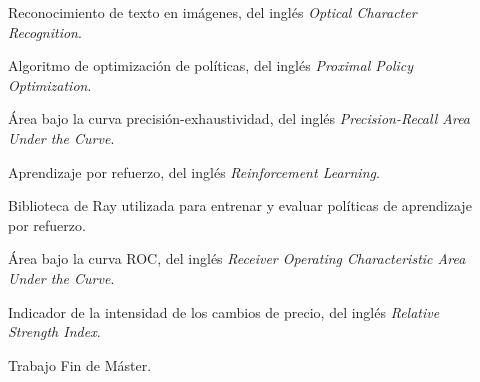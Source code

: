 \begin{description}
  \item[] Reconocimiento de texto en imágenes, del inglés \emph{Optical Character Recognition}.
  \item[] Algoritmo de optimización de políticas, del inglés \emph{Proximal Policy Optimization}.
  \item[] Área bajo la curva precisión-exhaustividad, del inglés \emph{Precision-Recall Area Under the Curve}.
  \item[] Aprendizaje por refuerzo, del inglés \emph{Reinforcement Learning}.
  \item[] Biblioteca de Ray utilizada para entrenar y evaluar políticas de aprendizaje por refuerzo.
  \item[] Área bajo la curva ROC, del inglés \emph{Receiver Operating Characteristic Area Under the Curve}.
  \item[] Indicador de la intensidad de los cambios de precio, del inglés \emph{Relative Strength Index}.
  \item[] Trabajo Fin de Máster.
\end{description}
\indicebottomrule
